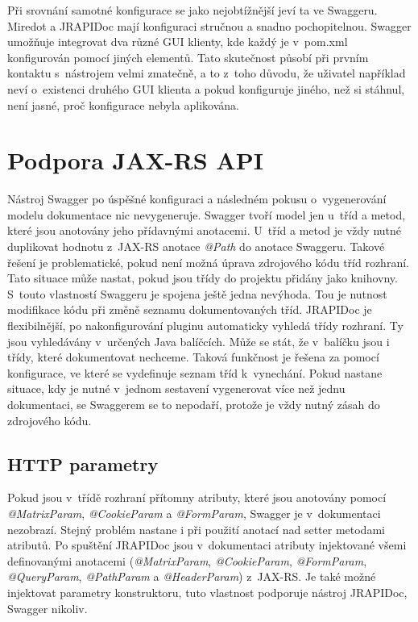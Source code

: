 \documentclass[11pt,twoside,a4paper]{book}
\begin{document}
Při srovnání samotné konfigurace se jako nejobtížnější jeví ta ve Swaggeru.
Miredot a JRAPIDoc mají konfiguraci stručnou a snadno pochopitelnou. Swagger
umožňuje integrovat dva různé GUI klienty, kde každý je v~pom.xml konfigurován
pomocí jiných elementů. Tato skutečnost působí při prvním kontaktu s~nástrojem
velmi zmatečně, a to z~toho důvodu, že uživatel například neví o~existenci
druhého GUI klienta a pokud konfiguruje jiného, než si stáhnul, není jasné, proč
konfigurace nebyla aplikována.

\section{Podpora JAX-RS API}

Nástroj Swagger po úspěšné konfiguraci a následném pokusu o~vygenerování modelu
dokumentace nic nevygeneruje. Swagger tvoří model jen u~tříd a metod, které jsou
anotovány jeho přídavnými anotacemi. U~tříd a metod je vždy nutné duplikovat
hodnotu z~JAX-RS anotace {\em @Path} do anotace Swaggeru. Takové řešení je
problematické, pokud není možná úprava zdrojového kódu tříd rozhraní. Tato
situace může nastat, pokud jsou třídy do projektu přidány jako knihovny. S~touto
vlastností Swaggeru je spojena ještě jedna nevýhoda. Tou je nutnost modifikace kódu při
změně seznamu dokumentovaných tříd. JRAPIDoc je flexibilnější, po
nakonfigurování pluginu automaticky vyhledá třídy rozhraní.
Ty jsou vyhledávány v~určených Java balíčcích. Může se stát, že v~balíčku jsou i
třídy, které dokumentovat nechceme. Taková funkčnost je řešena za pomocí
konfigurace, ve které se vydefinuje seznam tříd k~vynechání. Pokud nastane
situace, kdy je nutné v~jednom sestavení vygenerovat více než jednu
dokumentaci, se Swaggerem se to nepodaří, protože je vždy nutný zásah do zdrojového kódu.

\subsection{HTTP parametry}

Pokud jsou v~třídě rozhraní přítomny atributy, které jsou anotovány pomocí {\em
@MatrixParam}, {\em @CookieParam} a {\em @FormParam}, Swagger je v~dokumentaci
nezobrazí. Stejný problém nastane i při použití anotací nad setter metodami
atributů. Po spuštění JRAPIDoc jsou v~dokumentaci atributy injektované všemi
definovanými anotacemi ({\em @MatrixParam}, {\em @CookieParam}, {\em
@FormParam}, {\em @QueryParam}, {\em @PathParam} a {\em @HeaderParam}) z~JAX-RS.
Je také možné injektovat parametry konstruktoru, tuto vlastnost podporuje
nástroj JRAPIDoc, Swagger nikoliv.
\end{document}
